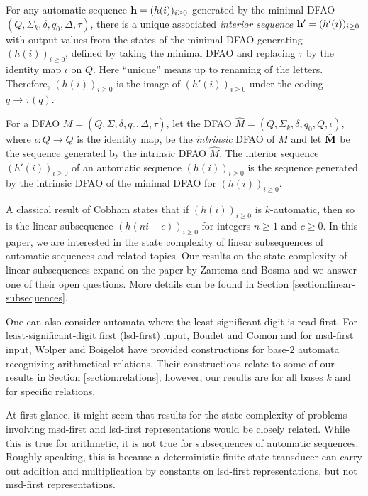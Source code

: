 \documentclass[12pt,reqno]{article}
\begin{document}
\sloppy
For any
automatic sequence ${\bf h} = (h(i))_{i \geq 0}$ generated by the minimal DFAO $(Q, \Sigma_k, \delta, q_0, \Delta, \tau)$, there is a 
unique associated {\it interior sequence} ${\bf h}' = (h'(i))_{i \geq 0}$ with output values from the states of the minimal DFAO generating $(h(i))_{i \geq 0}$, defined
by taking the minimal DFAO and replacing $\tau$ by the identity map $\iota$ on $Q$.  Here ``unique'' means up to renaming of the letters.
Therefore, $(h(i))_{i \geq 0}$ is the image of
$(h'(i))_{i \geq 0}$
under the coding $q \rightarrow \tau(q)$.

For a DFAO $M=(Q, \Sigma, \delta, q_0, \Delta, \tau)$, let the DFAO  $\hat{M}=(Q, \Sigma_k, \delta, q_0, Q, \iota)$, where $\iota:Q \rightarrow  Q$ is the identity map, be the \textit{intrinsic} DFAO of $M$ and let $\hat{\bf M}$ be the sequence generated by the intrinsic DFAO $\hat{M}$.
The interior sequence $(h'(i))_{i \geq 0}$ of an automatic sequence $(h(i))_{i \geq 0}$ is the sequence generated by the intrinsic DFAO of the minimal DFAO for $(h(i))_{i \geq 0}$.  

A classical result of Cobham \cite[p.~174]{cobham_uniform_1972} states that if $(h(i))_{i \geq 0}$ is $k$-automatic, then so is the linear subsequence $(h(ni+c))_{i \geq 0}$ for
integers $n\geq 1$ and $ c \geq 0$.  In this paper, we are interested in the state complexity of linear subsequences of automatic sequences and related topics. Our results on the state complexity of linear subsequences expand on the paper by Zantema and Bosma \cite{zantema_complexity_2022} and we answer one of their open questions. More details can be found in Section \ref{section:linear-subsequences}.

One can also consider automata where the least significant digit is read first.  For least-significant-digit first (lsd-first) input, Boudet and Comon \cite{boudet_diophantine_1996} and for msd-first input, Wolper and Boigelot \cite{wolper_construction_2000} have provided constructions for base-$2$ automata recognizing arithmetical relations. Their constructions relate to some of our results in Section \ref{section:relations}; however, our results are for all bases $k$ and for specific relations.

At first glance, it might seem that results for the state complexity of problems involving msd-first and lsd-first representations would be closely related.  While this is true for arithmetic, it is not true for subsequences of automatic sequences.  Roughly speaking, this is because a deterministic finite-state transducer can carry out addition and multiplication by constants on lsd-first representations, but not msd-first representations.
\end{document}
